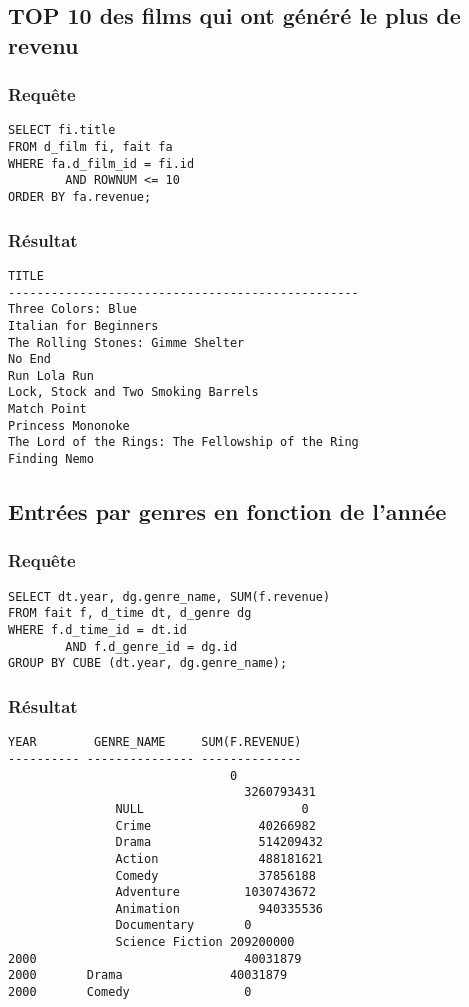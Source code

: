 \subsection{TOP 10 des films qui ont généré le plus de revenu}
\subsubsection{Requête}
\begin{lstlisting}
SELECT fi.title
FROM d_film fi, fait fa
WHERE fa.d_film_id = fi.id
		AND ROWNUM <= 10
ORDER BY fa.revenue;
\end{lstlisting}
\subsubsection{Résultat}
\begin{lstlisting}
TITLE
-------------------------------------------------
Three Colors: Blue
Italian for Beginners
The Rolling Stones: Gimme Shelter
No End
Run Lola Run
Lock, Stock and Two Smoking Barrels
Match Point
Princess Mononoke
The Lord of the Rings: The Fellowship of the Ring
Finding Nemo

\end{lstlisting}

\subsection{Entrées par genres en fonction de l’année}
\subsubsection{Requête}
\begin{lstlisting}
SELECT dt.year, dg.genre_name, SUM(f.revenue)
FROM fait f, d_time dt, d_genre dg
WHERE f.d_time_id = dt.id
		AND f.d_genre_id = dg.id
GROUP BY CUBE (dt.year, dg.genre_name);
\end{lstlisting}
\subsubsection{Résultat}
\begin{lstlisting}
YEAR        GENRE_NAME	   SUM(F.REVENUE)
---------- --------------- --------------
		                       0
			                     3260793431
		       NULL 					 0
		       Crime		       40266982
		       Drama		       514209432
		       Action		       488181621
		       Comedy		       37856188
		       Adventure	     1030743672
		       Animation		   940335536
		       Documentary		 0
		       Science Fiction 209200000
2000			                 40031879
2000       Drama		       40031879
2000       Comedy			     0

\end{lstlisting}

